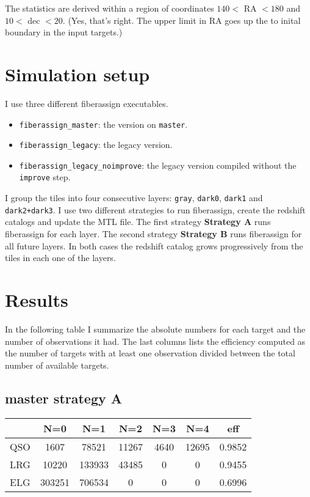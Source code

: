 \documentclass{article}
\begin{document}
The statistics are derived within a region of coordinates 
$140<$ RA $<180$ and
$10<$ dec $<20$. (Yes, that's right. The upper limit in RA goes up the
to inital boundary in the input targets.)

\section{Simulation setup}

I use three different fiberassign executables.
\begin{itemize}
\item \verb"fiberassign_master": the version on \verb'master'.
\item \verb"fiberassign_legacy": the legacy version.
\item \verb'fiberassign_legacy_noimprove': the legacy version compiled
without the \verb'improve' step.
\end{itemize}

I group the tiles into four consecutive layers: \verb'gray', \verb'dark0',
\verb'dark1' and \verb'dark2+dark3'.
I use two different strategies to run fiberassign,  create the
redshift catalogs and update the MTL file. 
The first strategy \textbf{Strategy A} runs fiberassign for each
layer.
The second strategy \textbf{Strategy B} runs fiberassign for all
future layers.
In both cases the redshift catalog grows progressively from the tiles
in each one of the layers.



\section{Results}

In the following table I summarize the absolute numbers for 
each target and the number of observations it had. The last columns
lists the efficiency computed as the number of targets with at least
one observation divided between the total number of available targets.

\newpage

\subsection*{master strategy A}
\begin{center}
\begin{tabular}{l|ccccc|c}
 & N=0 & N=1 & N=2 & N=3 & N=4 & eff\\\hline
QSO & 1607 & 78521 & 11267 & 4640 & 12695 & 0.9852\\
LRG & 10220 & 133933 & 43485 & 0 & 0 &  0.9455\\
ELG & 303251& 706534 & 0& 0 & 0 & 0.6996
\end{tabular}
\end{center}
\end{document}
